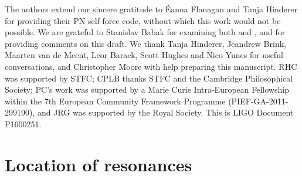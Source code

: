 \documentclass[aps,prd,amsfonts,amssymb,amsmath,nofootinbib,showpacs,superscriptaddress,twocolumn,floatfix]{revtex4-1}
\begin{document}
\begin{acknowledgments}
The authors extend our sincere gratitude to \'{E}anna Flanagan and Tanja Hinderer for providing their PN self-force code, without which this work would not be possible. We are grateful to Stanislav Babak for examining both \cite{BerryThesis2013} and \cite{ColeThesis2015}, and for providing comments on this draft. We thank Tanja Hinderer, Jeandrew Brink, Maarten van de Meent, Leor Barack, Scott Hughes and Nico Yunes for useful conversations, and Christopher Moore with help preparing this manuscript. RHC was supported by STFC; CPLB thanks STFC and the Cambridge Philosophical Society; PC's work was supported by a Marie Curie Intra-European Fellowship within the 7th European Community Framework Programme (PIEF-GA-2011-299190), and JRG was supported by the Royal Society. This is LIGO Document P1600251. 
\end{acknowledgments}

\appendix

\section{Location of resonances}\label{sec:location}
\end{document}
